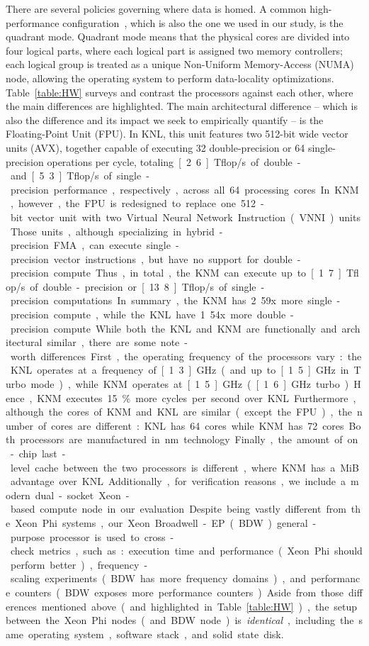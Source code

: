 There are several policies governing where data is homed. A common high-performance configuration~\cite{gawande_scaling_2017}, which is also the one we used in our study, is the quadrant mode. Quadrant mode means that the physical cores are divided into four logical parts, where each logical part is assigned two memory controllers; each logical group is treated as a unique Non-Uniform Memory-Access (NUMA) node, allowing the operating system to perform data-locality optimizations.
Table~\ref{table:HW} surveys and contrast the processors against each other, where the main differences are highlighted. The main architectural difference -- which is also the difference and its impact we seek to empirically quantify -- is the Floating-Point Unit (FPU). In KNL, this unit features two 512-bit wide vector units (AVX), together capable of executing 32 double-precision or 64 single-precision operations per cycle, totaling~\unit[2.6]{Tflop/s} of double- and~\unit[5.3]{Tflop/s} of single-precision performance, respectively, across all 64 processing cores. In KNM, however, the FPU is redesigned to replace one 512-bit vector unit with two Virtual Neural Network Instruction (VNNI) units. Those units, although specializing in hybrid-precision FMA, can execute single-precision vector instructions, but have no support for double-precision compute. Thus, in total, the KNM can execute up to~\unit[1.7]{Tflop/s} of double-precision or~\unit[13.8]{Tflop/s} of single-precision computations. In summary, the KNM has~2.59x more single-precision compute, while the KNL have~1.54x more double-precision compute.

While both the KNL and KNM are functionally and architectural similar, there are some note-worth differences. First, the operating frequency of the processors vary: the KNL operates at a frequency of~\unit[1.3]{GHz} (and up to~\unit[1.5]{GHz} in Turbo mode), while KNM operates at~\unit[1.5]{GHz} (\unit[1.6]{GHz} turbo). Hence, KNM executes~15\% more cycles per second over KNL. Furthermore, although the cores of KNM and KNL are similar (except the FPU), the number of cores are different: KNL has~64 cores while KNM has~72 cores. Both processors are manufactured in~\unit[14]{nm} technology. Finally, the amount of on-chip last-level cache between the two processors is different, where KNM has a~\unit[4]{MiB} advantage over KNL.

Additionally, for verification reasons, we include a modern dual-socket Xeon-based compute node in our evaluation. Despite being vastly different from the Xeon Phi systems, our Xeon Broadwell-EP (BDW) general-purpose processor is used to cross-check metrics, such as: execution time and performance (Xeon Phi should perform better), frequency-scaling experiments (BDW has more frequency domains), and performance counters (BDW exposes more performance counters).
Aside from those differences mentioned above (and highlighted in Table~\ref{table:HW}), the setup between the Xeon Phi nodes (and BDW node) is \textit{identical}, including the same operating system, software stack, and solid state disk. %

